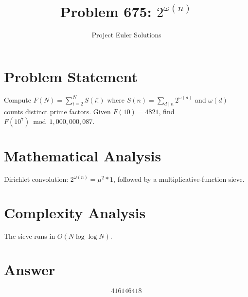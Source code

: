 \documentclass[11pt]{article}
\title{Problem 675: $2^{\omega(n)}$}
\author{Project Euler Solutions}
\date{}
\begin{document}
\maketitle

\section{Problem Statement}

Compute $F(N)=\sum_{i=2}^{N} S(i!)$ where $S(n)=\sum_{d\mid n} 2^{\omega(d)}$ and $\omega(d)$ counts distinct prime factors. Given $F(10)=4821$, find $F(10^7)\bmod 1{,}000{,}000{,}087$.

\section{Mathematical Analysis}

Dirichlet convolution: $2^{\omega(n)} = \mu^2 * 1$, followed by a multiplicative-function sieve.

\section{Complexity Analysis}

The sieve runs in $O(N \log \log N)$.

\section{Answer}

\[
\boxed{416146418}
\]
\end{document}
